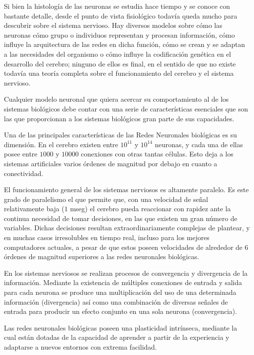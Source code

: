 Si bien la histología de las neuronas se estudia hace tiempo y se conoce con bastante detalle, desde el punto de vista fisiológico todavía queda mucho para descubrir sobre el sistema nervioso. Hay diversos modelos sobre cómo las neuronas cómo grupo o individuos representan y procesan información, cómo influye la arquitectura de las redes en dicha función, cómo se crean y se adaptan a las necesidades del organismo o cómo influye la codificación genética en el desarrollo del cerebro; ninguno de ellos es final, en el sentido de que no existe todavía una teoría completa sobre el funcionamiento del cerebro y el sistema nervioso.

Cualquier modelo neuronal que quiera acercar su comportamiento al de los sistemas biológicos debe contar con una serie de características esenciales que son las que proporcionan a los sistemas biológicos gran parte de sus capacidades.

Una de las principales características de las Redes Neuronales biológicas es su dimensión. En el cerebro existen entre $10^{11}$ y $10^{14}$ neuronas, y cada una de ellas posee entre $1000$ y $10000$ conexiones con otras tantas células. Esto deja a los sistemas artificiales varios órdenes de magnitud por debajo en cuanto a conectividad.

El funcionamiento general de los sistemas nerviosos es altamente paralelo. Es este grado de paralelismo el que permite que, con una velocidad de señal relativamente baja ($1$ mseg) el cerebro pueda reaccionar con rapidez ante la continua necesidad de tomar decisiones, en las que existen un gran número de variables. Dichas decisiones resultan extraordinariamente complejas de plantear, y en muchas casos irresolubles en tiempo real, incluso para los mejores computadores actuales, a pesar de que estos poseen velocidades de alrededor de $6$ órdenes de magnitud superiores a las redes neuronales biológicas. 

En los sistemas nerviosos se realizan procesos de convergencia y divergencia de la información. Mediante la existencia de múltiples conexiones de entrada y salida para cada neurona se produce una multiplicación del uso de una determinada información (divergencia) así como una combinación de diversas señales de entrada para producir un efecto conjunto en una sola neurona (convergencia).

Las redes neuronales biológicas poseen una plasticidad intrínseca, mediante la cual están dotadas de la capacidad de aprender a partir de la experiencia y adaptarse a nuevos entornos con extrema facilidad.

